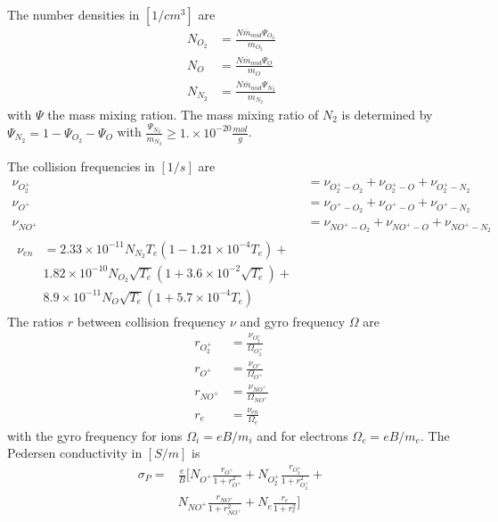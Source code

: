 The number densities in $[1/cm^3]$ are
%
\begin{align}
  N_{O_2} &= \frac{N \overline{m}_{mid} \Psi_{O_2}}{m_{O_2}} \\
  N_{O}   &= \frac{N \overline{m}_{mid} \Psi_{O}}{m_{O}} \\
  N_{N_2} &= \frac{N \overline{m}_{mid} \Psi_{N_2}}{m_{N_2}}
\end{align}
%
with $\Psi$ the mass mixing ration. The mass mixing ratio of $N_2$
is determined by $\Psi_{N_2}= 1 - \Psi_{O_2}-\Psi_{O}$ with
$\frac{\Psi_{N_2}}{m_{N_2}} \geq 1. \times 10^{-20} \frac{mol}{g}$.

The collision frequencies in $[1/s]$ are
%
\begin{align}
  \nu_{O_2^+} &= \nu_{O_2^+ - O_2} + \nu_{O_2^+ - O} +
  \nu_{O_2^+ - N_2}  \\
  \nu_{O^+}   &= \nu_{O^+ - O_2} + \nu_{O^+ - O} +
  \nu_{O^+ - N_2}  \\
  \nu_{NO^+}  &= \nu_{NO^+ - O_2} + \nu_{NO^+ - O} +
  \nu_{NO^+ - N_2}  \\
  \begin{split}
  \nu_{en}   &= 2.33\times10^{-11} N_{N_2} T_e (1-1.21 \times 10^{-4}
  T_e) + \\
   & 1.82 \times 10^{-10} N_{O_2} \sqrt{T_e} (1 + 3.6 \times 10^{-2}
  \sqrt{T_e}) + \\
   & 8.9 \times 10^{-11} N_O \sqrt{T_e} (1 + 5.7 \times 10^{-4} T_e)
  \end{split}
\end{align}
%
The ratios $r$ between collision frequency $\nu$ and gyro frequency
$\Omega$ are
%
\begin{align}
  r_{O_2^+} &= \frac{\nu_{O_2^+}}{\Omega_{O_2^+}}\\
  r_{O^+}   &= \frac{\nu_{O^+}}{\Omega_{O^+}}\\
  r_{NO^+}  &= \frac{\nu_{NO^+}}{\Omega_{NO^+}}\\
  r_{e}     &= \frac{\nu_{en}}{\Omega_{e}}
\end{align}
%
with the gyro frequency for ions $\Omega_i = e B/m_i$ and for
electrons $\Omega_e=eB/m_e$.
%
The Pedersen conductivity in $[ S/m]$ is
%
\begin{equation}
  \begin{split}
   \sigma_P = &\frac{e}{B} [ N_{O^+} \frac{r_{O^+}}
      {1+r_{O^+}^2 } +
       N_{O_2^+} \frac{r_{O_2^+}}
      {1+r_{O_2^+}^2 } + \\
       & N_{NO^+} \frac{r_{NO^+}}
      {1+r_{NO^+}^2 } +
       N_{e} \frac{r_e}
      {1+r_e^2 } ]
  \end{split}
\end{equation}
